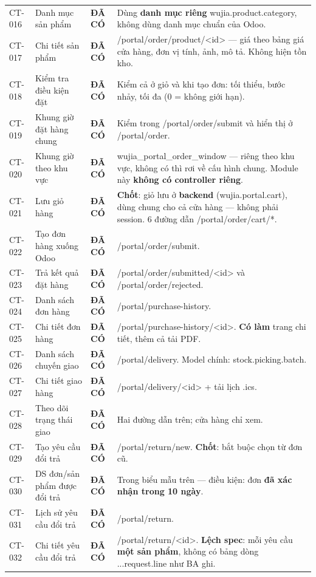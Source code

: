 \documentclass[11pt,a4paper]{report}
\newcommand{\ok}{\textcolor{okc}{\textbf{ĐÃ CÓ}}}
\newcommand{\rt}[1]{{\ttfamily\footnotesize #1}}
\begin{document}
{\begin{longtable}{@{}L{1.2cm}L{4.2cm}L{1.9cm}L{7.6cm}@{}}
CT-016 & Danh mục sản phẩm & \ok & Dùng \textbf{danh mục riêng} \rt{wujia.product.category}, không dùng danh mục chuẩn của Odoo. \\
CT-017 & Chi tiết sản phẩm & \ok & \rt{/portal/order/product/<id>} — giá theo bảng giá cửa hàng, đơn vị tính, ảnh, mô tả. Không hiện tồn kho. \\
CT-018 & Kiểm tra điều kiện đặt & \ok & Kiểm cả ở giỏ và khi tạo đơn: tối thiểu, bước nhảy, tối đa (0 = không giới hạn). \\
CT-019 & Khung giờ đặt hàng chung & \ok & Kiểm trong \rt{/portal/order/submit} và hiển thị ở \rt{/portal/order}. \\
CT-020 & Khung giờ theo khu vực & \ok & \rt{wujia\_portal\_order\_window} — riêng theo khu vực, không có thì rơi về cấu hình chung. Module này \textbf{không có controller riêng}. \\
CT-021 & Lưu giỏ hàng & \ok & \textbf{Chốt}: giỏ lưu ở \textbf{backend} (\rt{wujia.portal.cart}), dùng chung cho cả cửa hàng — không phải session. 6 đường dẫn \rt{/portal/order/cart/*}. \\
CT-022 & Tạo đơn hàng xuống Odoo & \ok & \rt{/portal/order/submit}. \\
CT-023 & Trả kết quả đặt hàng & \ok & \rt{/portal/order/submitted/<id>} và \rt{/portal/order/rejected}. \\
CT-024 & Danh sách đơn hàng & \ok & \rt{/portal/purchase-history}. \\
CT-025 & Chi tiết đơn hàng & \ok & \rt{/portal/purchase-history/<id>}. \textbf{Có làm} trang chi tiết, thêm cả tải PDF. \\
CT-026 & Danh sách chuyến giao & \ok & \rt{/portal/delivery}. Model chính: \rt{stock.picking.batch}. \\
CT-027 & Chi tiết giao hàng & \ok & \rt{/portal/delivery/<id>} + tải lịch \rt{.ics}. \\
CT-028 & Theo dõi trạng thái giao & \ok & Hai đường dẫn trên; cửa hàng chỉ xem. \\
CT-029 & Tạo yêu cầu đổi trả & \ok & \rt{/portal/return/new}. \textbf{Chốt}: bắt buộc chọn từ đơn cũ. \\
CT-030 & DS đơn/sản phẩm được đổi trả & \ok & Trong biểu mẫu trên — điều kiện: đơn \textbf{đã xác nhận trong 10 ngày}. \\
CT-031 & Lịch sử yêu cầu đổi trả & \ok & \rt{/portal/return}. \\
CT-032 & Chi tiết yêu cầu đổi trả & \ok & \rt{/portal/return/<id>}. \textbf{Lệch spec}: mỗi yêu cầu \textbf{một sản phẩm}, không có bảng dòng \rt{...request.line} như BA ghi. \\

\end{longtable}}
\end{document}
